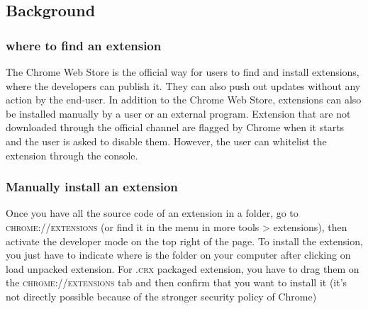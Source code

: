 \documentclass[12pt]{article}
\begin{document}
\begin{multicols}{2}
\subsection*{Background}
\subsubsection*{where to find an extension}
The Chrome Web Store is the official way for users
to find and install extensions, where the developers can publish it. They can also push out updates without any action
by the end-user.
In addition to the Chrome Web Store, extensions can
also be installed manually by a user or an external program.
Extension that are not downloaded through the official channel are flagged by Chrome when it starts	and the user is asked to disable them.
However, the user can whitelist the extension through the console.
\subsubsection*{Manually install an extension}
	Once you have all the source code of an extension in a folder, go to  \textsc{chrome://extensions} (or find it in the menu in more tools > extensions), then activate the developer mode on the top right of the page. To install the extension, you just have to indicate where is the folder on your computer after clicking on load unpacked extension. For \textsc{.crx} packaged extension, you have to drag them on the \textsc{chrome://extensions} tab and then confirm that you want to install it (it's not directly possible because of the stronger security policy of Chrome)

\end{multicols}
\end{document}
